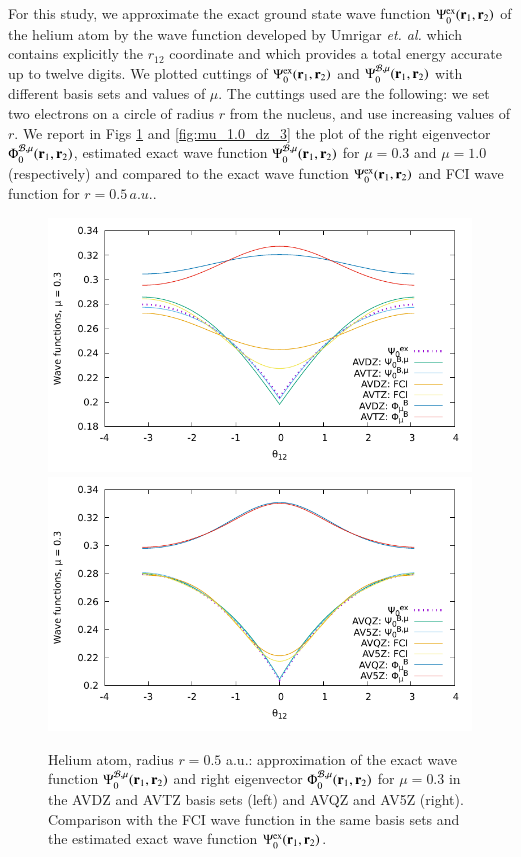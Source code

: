 \documentclass[aip,jcp,reprint,noshowkeys,superscriptaddress]{revtex4-1}
\newcommand{\br}[0]{{\bf {r}}}
\newcommand{\psiex}[0]{\Psi^{\text{ex}}_0}
\newcommand{\phimub}[0]{\Phi^{\mathcal{B},\mu}_0}
\newcommand{\psimub}[0]{\Psi^{\mathcal{B},\mu}_0}
\begin{document}
For this study, we approximate the exact ground state wave function $\psiex(\br{}_1,\br{}_2)$ of the helium atom by the wave function developed by Umrigar \textit{et. al.}\cite{UmrGon-PRA-94} which contains explicitly the $r_{12}$ coordinate and which provides a total energy accurate up to twelve digits.  
We plotted cuttings of $\psiex(\br{}_1,\br{}_2)$ and  $\psimub(\br{}_1,\br{}_2) $ with different basis sets and values of $\mu$. The cuttings used are the following: we set two electrons on a circle of radius $r$ from the nucleus, and use increasing values of $r$. 
We report in Figs \ref{fig:mu_0.3_dz_3} and \ref{fig:mu_1.0_dz_3} the plot of the right eigenvector $\phimub(\br{}_1,\br{}_2)$, estimated exact wave function $\psimub(\br{}_1,\br{}_2)$ for $\mu=0.3$ and $\mu=1.0$ (respectively) and compared to the exact wave function $\psiex(\br{}_1,\br{}_2)$ and FCI wave function for $r=0.5\,a.u.$. 
\begin{figure}
 \label{fig:mu_0.3_dz_3}
        \includegraphics[width=0.45\linewidth]{plots/He//He_mu_0_3_cusp_avdz_avtz_3.pdf}
        \includegraphics[width=0.45\linewidth]{plots/He/He_mu_0_3_cusp_avqz_av5z_3.pdf}\\
        \caption{
        Helium atom, radius $r=0.5$ a.u.: approximation of the exact wave function $\psimub(\br{}_1,\br{}_2)$ and right eigenvector $\phimub(\br{}_1,\br{}_2)$ for $\mu=0.3$ in the AVDZ and AVTZ basis sets (left) and AVQZ and AV5Z (right). Comparison with the FCI wave function in the same basis sets and the estimated exact wave function $\psiex(\br{}_1,\br{}_2)$.  }
\end{figure}
\end{document}
